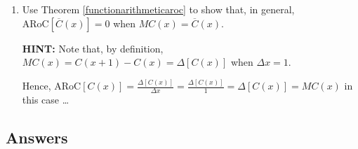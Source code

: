\begin{enumerate}
\begin{enumerate}
\item  Use Theorem \ref{functionarithmeticaroc} to show that, in general, $\text{ARoC}[ \overline{C}(x)] = 0$ when $MC(x) = \overline{C}(x)$.

\smallskip

\textbf{HINT:}  Note that, by definition, $MC(x) = C(x+1) - C(x) = \Delta[C(x)]$ when $\Delta x = 1$.  

\smallskip

Hence,  $\text{ARoC}[C(x)] = \frac{\Delta[C(x)]}{\Delta x} = \frac{\Delta[C(x)]}{1} = \Delta[C(x)] = MC(x)$ in this case \ldots 

\end{enumerate}

\setcounter{HW}{\value{enumi}}

\end{enumerate}


\newpage

\subsection{Answers}

